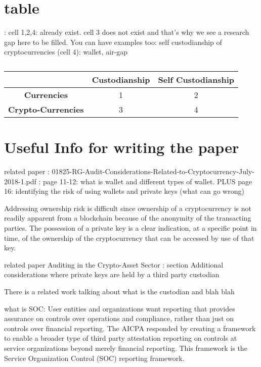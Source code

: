  \section{table} : cell 1,2,4: already exist.  cell 3 does not exist and that's why we see a research gap here to be filled.
 You can have examples too: self custodianship of cryptocurrencies (cell 4): wallet, air-gap

 \begin{table}[t]
\centering
\begin{tabular}{|c|c|c|}  
\hline
& \textbf{Custodianship} & \textbf{Self Custodianship}   \\ \hline
\textbf{Currencies} & 1 & 2 \\ \hline
\textbf{Crypto-Currencies} & 3 & 4 \\
\hline
\end{tabular}
\caption{\footnotesize{}\label{tab:}}
\end{table}



\section{Useful Info for writing the paper}
 related paper : 01825-RG-Audit-Considerations-Related-to-Cryptocurrency-July-2018-1.pdf : page 11-12: what is wallet and different types of wallet. PLUS page 16: identifying the risk of using wallets and private keys (what can go wrong)
 \par
Addressing ownership risk is difficult since ownership of a cryptocurrency
is not readily apparent from a blockchain because of the anonymity of the
transacting parties. The possession of a private key is a clear indication,
at a specific point in time, of the ownership of the cryptocurrency that
can be accessed by use of that key.

\par
related paper Auditing in the Crypto-Asset Sector : section Additional considerations where private keys are held by a third party custodian\par

There is a related work talking about what is the custodian and blah blah
\par what is SOC: User entities and organizations want reporting that provides assurance on
controls over operations and compliance, rather than just on controls over
financial reporting. The AICPA responded by creating a framework to enable a
broader type of third party attestation reporting on controls at service
organizations beyond merely financial reporting. This framework is the Service
Organization Control (SOC) reporting framework.
\par

